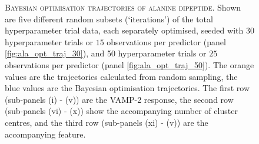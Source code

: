 \begin{figure}[p]
    \centering
    \caption[Bayesian optimisation trajectories of alanine dipeptide]{\textsc{Bayesian optimisation trajectories of alanine dipeptide}. Shown are five different random subsets  (`iterations') of the total hyperparameter trial data, each separately optimised, seeded with $30$ hyperparameter trials or $15$ observations per predictor (panel \ref{fig:ala_opt_traj_30}), and 50 hyperparameter trials or $25$ observations per predictor (panel \ref{fig:ala_opt_traj_50}). The orange values are the trajectories calculated from random sampling, the blue values are the Bayesian optimisation trajectories. The first row (sub-panels (i) - (v)) are the VAMP-2 response, the second row (sub-panels (vi) - (x)) show the accompanying number of cluster centres, and the third row (sub-panels (xi) - (v)) are the  accompanying feature.}\label{fig:ala_opt_traj}
\end{figure}

